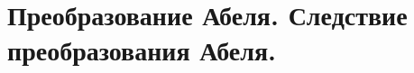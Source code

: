 \documentclass[../main.tex]{subfiles}
\begin{document}
\newpage
\section{Преобразование Абеля. Следствие преобразования Абеля.}
\end{document}
